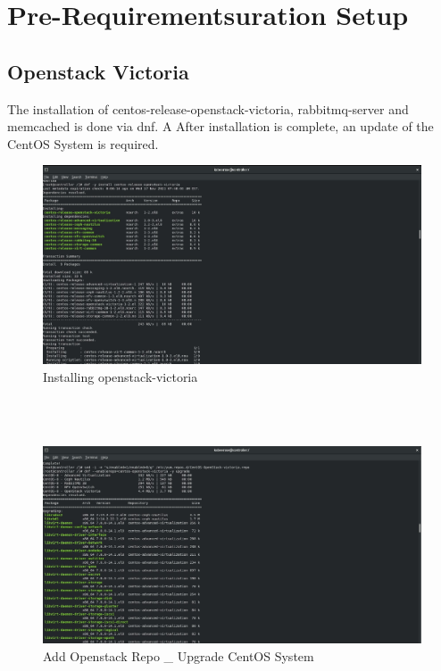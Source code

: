 \chapter{Pre-Requirementsuration Setup}
\begin{spacing}{1.2}
\section{Openstack Victoria}

\par The installation of centos-release-openstack-victoria, rabbitmq-server and memcached is done via dnf. A
After installation is complete, an update of the CentOS System is required. 
\\
\begin{figure}[!htb] 
\begin{center} 
\includegraphics[width=1\linewidth]{Cloud/Pre-Requirements/Installing openstack-victoria} 
\end{center} 
\caption{Installing openstack-victoria} 
\end{figure}  \FloatBarrier
\\
\\
\begin{figure}[!htb] 
\begin{center} 
\includegraphics[width=1\linewidth]{Cloud/Pre-Requirements/Add Openstack Repo _ Upgrade CentOS System} 
\end{center} 
\caption{Add Openstack Repo _ Upgrade CentOS System} 
\end{figure}  \FloatBarrier
\\


\end{spacing}

